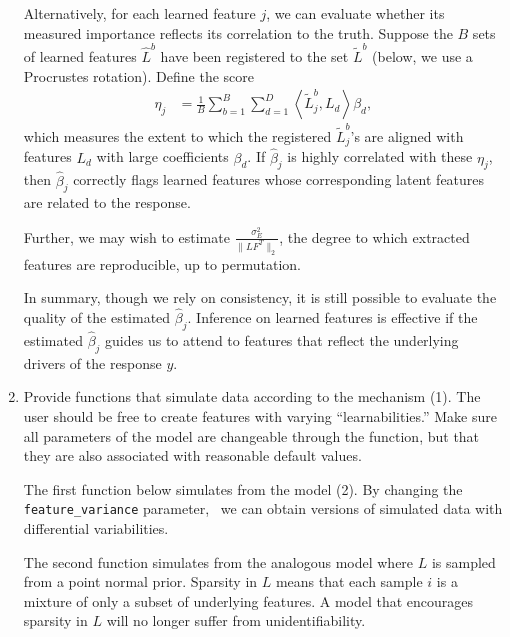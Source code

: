 \documentclass[]{article}
\begin{document}
\begin{enumerate}
Alternatively, for each learned feature $j$, we can evaluate whether its
measured importance reflects its correlation to the truth. Suppose the $B$ sets
of learned features $\hat{L}^b$ have been registered to the set  $\tilde{L}^b$
(below, we use a Procrustes rotation). Define the score
\begin{align*}
\eta_j &= \frac{1}{B} \sum_{b = 1}^B \sum_{d = 1}^{D} \left< \tilde{L}_j^{b}, L_d\right> \beta_d,
\end{align*} which measures the extent to which the registered
$\tilde{L}_j^{b}$’s are aligned with features $L_d$ with large coefficients
$\beta_d$. If $\hat{\beta}_j$ is highly correlated with these $\eta_j$, then
$\hat{\beta}_j$ correctly flags learned features whose corresponding latent
features are related to the response.

Further, we may wish to estimate $\frac{\sigma_{E}^2}{\|LF^T\|_{2}}$, the
degree to which extracted features are reproducible, up to permutation.

In summary, though we rely on consistency, it is still possible to evaluate the
quality of the estimated $\hat{\beta}_j$. Inference on learned features is
effective if the estimated $\hat{\beta}_j$ guides us to attend to features that
reflect the underlying drivers of the response $y$.

\item  Provide functions that simulate data according to the mechanism (1). The
user should be free to create features with varying ``learnabilities.'' Make
sure all parameters of the model are changeable through the function, but that
they are also associated with reasonable default values.

The first function below simulates from the model (2). By changing the
\texttt{feature\_variance} parameter,  we can obtain versions of simulated data
with differential variabilities.

The second function simulates from the analogous model where $L$ is sampled
from a point normal prior. Sparsity in $L$ means that each sample $i$ is a
mixture of only a subset of underlying features. A model that encourages
sparsity in $L$ will no longer suffer from unidentifiability.

\end{enumerate}
\end{document}
